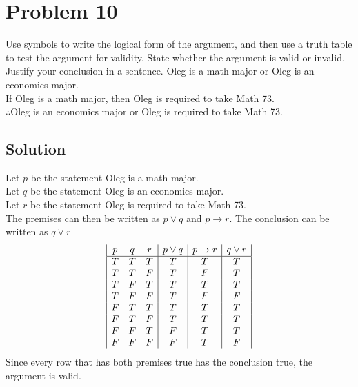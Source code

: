 \documentclass[table]{article}
\begin{document}
\section{Problem 10}
Use symbols to write the logical form of the argument, and then use a truth table to test the argument for validity. State whether the argument is valid or invalid. Justify your conclusion in a sentence.
Oleg is a math major or Oleg is an economics major.\\
If Oleg is a math major, then Oleg is required to take Math 73.\\
$\therefore$Oleg is an economics major or Oleg is required to take Math 73.
\subsection{Solution}
Let $p$ be the statement Oleg is a math major.\\
Let $q$ be the statement Oleg is an economics major.\\
Let $r$ be the statement Oleg is required to take Math 73.\\
The premises can then be written as $p \lor q$ and $p \rightarrow r$. The conclusion can be written as $q \lor r$
\begin{displaymath}
\begin{array}{|c c c|c|c|c|}
p & q & r & p \lor q & p \rightarrow r & q \lor r\\
\hline
T & T & T & T & T & T\\
T & T & F & T & F & T\\
T & F & T & T & T & T\\
T & F & F & T & F & F\\
F & T & T & T & T & T\\
F & T & F & T & T & T\\
F & F & T & F & T & T\\
F & F & F & F & T & F\\
\end{array}
\end{displaymath}
Since every row that has both premises true has the conclusion true, the argument is valid.
\end{document}
